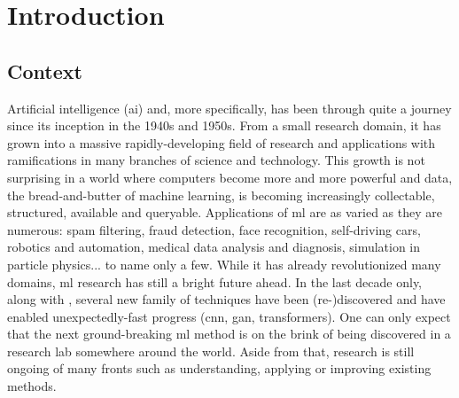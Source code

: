 \chapter{Introduction}

\section{Context}

Artificial intelligence (\acrshort{ai}) and, more specifically,  has been through quite a journey since its inception in the 1940s and 1950s. From a small research domain, it has grown into a massive rapidly-developing field of research and applications with ramifications in many branches of science and technology. This growth is not surprising in a world where computers become more and more powerful and data, the bread-and-butter of machine learning, is becoming increasingly collectable, structured, available and queryable. Applications of \acrlong{ml} are as varied as they are numerous: spam filtering, fraud detection, face recognition, self-driving cars, robotics and automation, medical data analysis and diagnosis, simulation in particle physics... to name only a few. While it has already revolutionized many domains, \acrlong{ml} research has still a bright future ahead. In the last decade only, along with , several new family of techniques have been (re-)discovered and have enabled unexpectedly-fast progress (\eg \acrlong{cnn}, \acrlong{gan}, transformers). One can only expect that the next ground-breaking \acrshort{ml} method is on the brink of being discovered in a research lab somewhere around the world. Aside from that, research is still ongoing of many fronts such as understanding, applying or improving existing methods.

